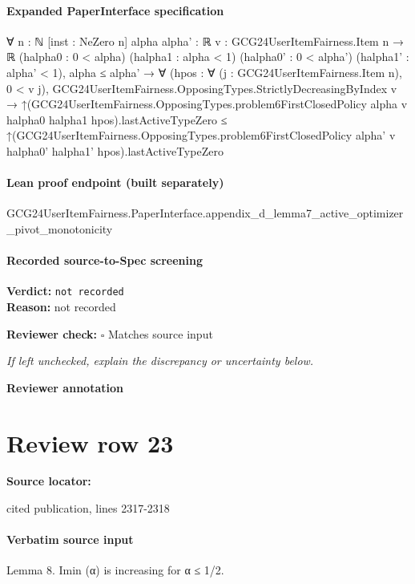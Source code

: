 \documentclass[10pt]{article}
\newcommand{\reviewerbox}{%
  \par\noindent\fbox{\parbox{0.96\linewidth}{\rule{0pt}{0.38in}}}\par
}
\newcommand{\reviewmatch}[1]{%
  \par\noindent\textbf{Reviewer check:} $\square$\; #1\par
  \noindent\emph{If left unchecked, explain the discrepancy or uncertainty below.}\par
}
\begin{document}
\paragraph{Expanded PaperInterface specification}
\begin{ReviewVerbatim}
∀ {n : ℕ} [inst : NeZero n] {alpha alpha' : ℝ} {v : GCG24UserItemFairness.Item n → ℝ} (halpha0 : 0 < alpha)
  (halpha1 : alpha < 1) (halpha0' : 0 < alpha') (halpha1' : alpha' < 1),
  alpha ≤ alpha' →
    ∀ (hpos : ∀ (j : GCG24UserItemFairness.Item n), 0 < v j),
      GCG24UserItemFairness.OpposingTypes.StrictlyDecreasingByIndex v →
        ↑(GCG24UserItemFairness.OpposingTypes.problem6FirstClosedPolicy alpha v halpha0 halpha1
                hpos).lastActiveTypeZero ≤
          ↑(GCG24UserItemFairness.OpposingTypes.problem6FirstClosedPolicy alpha' v halpha0' halpha1'
                hpos).lastActiveTypeZero
\end{ReviewVerbatim}

\paragraph{Lean proof endpoint (built separately)}\begin{ReviewVerbatim}
GCG24UserItemFairness.PaperInterface.appendix_d_lemma7_active_optimizer_pivot_monotonicity
\end{ReviewVerbatim}

\paragraph{Recorded source-to-Spec screening}
\textbf{Verdict:} \texttt{not recorded}
\\
\textbf{Reason:} not recorded
\reviewmatch{Matches source input}
\noindent\textbf{Reviewer annotation}\par
\reviewerbox
\clearpage
\hypertarget{source-claim-80513579ff0f392a}{}
\section*{Review row 23}
\textbf{Source locator:} {\footnotesize\raggedright cited publication, lines 2317-\allowbreak{}2318\par}
\paragraph{Verbatim source input}
\begin{ReviewVerbatim}
Lemma 8. Imin
(α) is increasing for α ≤ 1/2.
\end{ReviewVerbatim}
\end{document}
